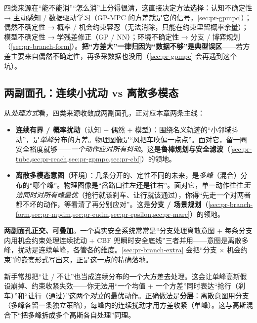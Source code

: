 \begin{insight}
四类来源在“能不能消”“怎么消”上分得很清，这直接决定方法选择：认知不确定性 → 主动感知 / 数据驱动学习（GP-MPC 的方差就是它的信号，\cref{sec:pr-gpmpc}）；偶然不确定性 → 概率 / 机会约束容忍（无法消除，只能在约束里留概率余量）；模型不确定性 → 学残差修正（GP / NN）；环境不确定性 → 分支 / 博弈规划（\cref{sec:pr-branch-form}）。\textbf{把“方差大”一律归因为“数据不够”是典型误区}——若方差主要来自偶然不确定性，再多采数据也没用（\cref{sec:pr-gpmpc} 会再遇到这个坑）。
\end{insight}

\subsection{两副面孔：连续小扰动 vs 离散多模态}
\label{sec:pr-unc-faces}

从\emph{处理方式}看，四类来源收敛成两副面孔，正对应本章两条主线：

\begin{itemize}
  \item \textbf{连续有界 / 概率扰动}（认知 + 偶然 + 模型）：围绕名义轨迹的“小邻域抖动”，是\emph{单峰}分布的方差。物理图像是“风把车吹偏一点点”。面对它，留一圈安全裕度就够——\emph{一个动作应对所有抖动}。这是\textbf{鲁棒规划与安全滤波}（\cref{sec:pr-tube,sec:pr-reach,sec:pr-gpmpc,sec:pr-cbf}）的领地。
  \item \textbf{离散多模态意图}（环境）：几条分开的、定性不同的未来，是\emph{多峰}（混合）分布的“哪个峰”。物理图像是“岔路口往左还是往右”。面对它，单一动作往往\emph{无法同时对所有峰最优}（抢行就该刹车、让行就该通过），你得“先走一个对两者都不坏的动作，等看清了再分别应对”。这是\textbf{分支 / 场景规划}（\cref{sec:pr-branch-form,sec:pr-mpdm,sec:pr-eudm,sec:pr-epsilon,sec:pr-marc}）的领地。
\end{itemize}

\begin{insight}
\textbf{两副面孔正交、可叠加}。一个真实安全系统常常是“分支处理离散意图 + 每条分支内用机会约束处理连续扰动 + CBF 兜瞬时安全底线”三者并用——意图是离散多峰，扰动是连续单峰，各管各的维度。\cref{sec:pr-branch-extra} 会把“分支 $\times$ 机会约束”的嵌套形式写出来，正是这一点的精确落地。
\end{insight}

\begin{pitfall}
新手常想把“让 / 不让”也当成连续分布的一个大方差去处理。这会让单峰高斯假设崩掉、约束收紧失效——你无法用“一个均值 + 一个方差”同时表达“抢行（刹车）”和“让行（通过）”这两个\emph{对立}的最优动作。正确做法是\textbf{分层}：离散意图用分支（多峰各留一条独立策略），每峰内的连续扰动才用方差收紧（单峰）。这与高斯混合下“把多峰拆成多个高斯各自处理”同理。
\end{pitfall}

